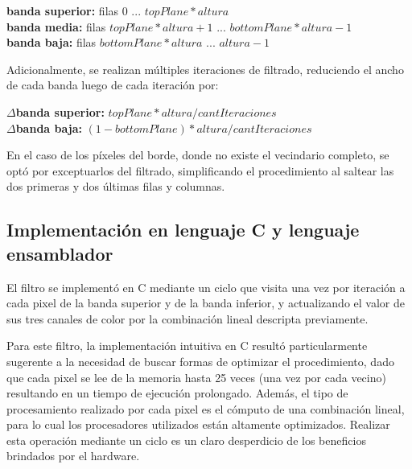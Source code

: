 \begin{center}
	\raggedright
	\hspace{100pt}\textbf{banda superior:} 	\hspace{10pt}filas 0 ... $topPlane * altura$\\
	\hspace{100pt}\textbf{banda media:} 		\hspace{22pt}filas $topPlane * altura + 1$ ... $bottomPlane * altura - 1$\\
	\hspace{100pt}\textbf{banda baja:} 		\hspace{31pt}filas $bottomPlane * altura$ ... $altura - 1$\\
\end{center}

Adicionalmente, se realizan múltiples iteraciones de filtrado, reduciendo el ancho de cada banda luego de cada iteración por:

\begin{center}
	\raggedright
	\hspace{100pt}$\Delta$\textbf{banda superior:} 	\hspace{10pt}$topPlane * altura / cantIteraciones$\\
	\hspace{100pt}$\Delta$\textbf{banda baja:} 		\hspace{31pt}$(1 - bottomPlane) * altura / cantIteraciones$\\
\end{center}

En el caso de los píxeles del borde, donde no existe el vecindario completo, se optó por exceptuarlos del filtrado, simplificando el procedimiento al saltear las dos primeras y dos últimas filas y columnas.

\subsection{Implementación en lenguaje C y lenguaje ensamblador}
\label{sub:miniature_implementaci_n_en_c}

El filtro se implementó en C mediante un ciclo que visita una vez por iteración a cada pixel de la banda superior y de la banda inferior, y actualizando el valor de sus tres canales de color por la combinación lineal descripta previamente.

Para este filtro, la implementación intuitiva en C resultó particularmente sugerente a la necesidad de buscar formas de optimizar el procedimiento, dado que cada pixel se lee de la memoria hasta 25 veces (una vez por cada vecino) resultando en un tiempo de ejecución prolongado. Además, el tipo de procesamiento realizado por cada pixel es el cómputo de una combinación lineal, para lo cual los procesadores utilizados están altamente optimizados. Realizar esta operación mediante un ciclo es un claro desperdicio de los beneficios brindados por el hardware.

